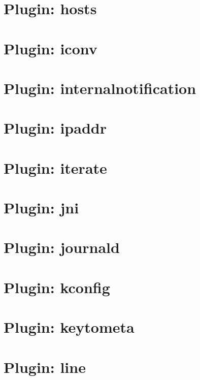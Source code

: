 \documentclass[twoside]{book}
\newcommand{\+}{\discretionary{\mbox{\scriptsize$\hookleftarrow$}}{}{}}
\begin{document}
\chapter{Plugin\+: hosts}
\label{autotoc_md265}

\chapter{Plugin\+: iconv}
\label{autotoc_md283}

\chapter{Plugin\+: internalnotification}
\label{autotoc_md289}

\chapter{Plugin\+: ipaddr}
\label{autotoc_md291}

\chapter{Plugin\+: iterate}
\label{autotoc_md308}

\chapter{Plugin\+: jni}
\label{autotoc_md309}

\chapter{Plugin\+: journald}
\label{autotoc_md319}

\chapter{Plugin\+: kconfig}
\label{autotoc_md322}

\chapter{Plugin\+: keytometa}
\label{autotoc_md338}

\chapter{Plugin\+: line}
\label{autotoc_md346}

\end{document}
